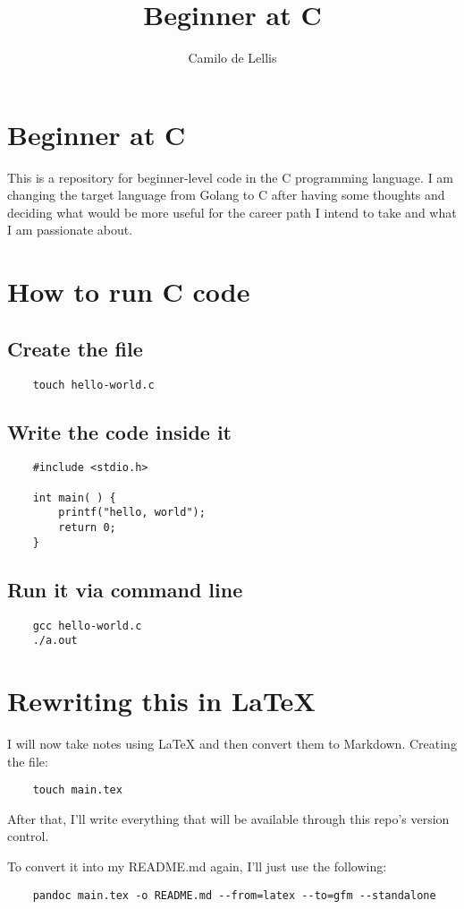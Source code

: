 \documentclass{article}
\title{Beginner at C}
\author{Camilo de Lellis}
\begin{document}
\maketitle
\tableofcontents

\section{Beginner at C}
This is a repository for beginner-level code in the C programming language. I am changing the target language from Golang to C after having some thoughts and deciding what would be more useful for the career path I intend to take and what I am passionate about.

\section{How to run C code}

\subsection{Create the file}
\begin{verbatim}
    touch hello-world.c
\end{verbatim}

\subsection{Write the code inside it}
\begin{verbatim}
    #include <stdio.h>

    int main( ) {
        printf("hello, world");
        return 0;
    }
\end{verbatim}

\subsection{Run it via command line}
\begin{verbatim}
    gcc hello-world.c 
    ./a.out 
\end{verbatim}

\section{Rewriting this in \LaTeX}
I will now take notes using \LaTeX{} and then convert them to Markdown. Creating the file:

\begin{verbatim}
    touch main.tex
\end{verbatim}

After that, I'll write everything that will be available through this repo's version control.

To convert it into my README.md again, I'll just use the following:
\begin{verbatim}
    pandoc main.tex -o README.md --from=latex --to=gfm --standalone
\end{verbatim}



\end{document}
